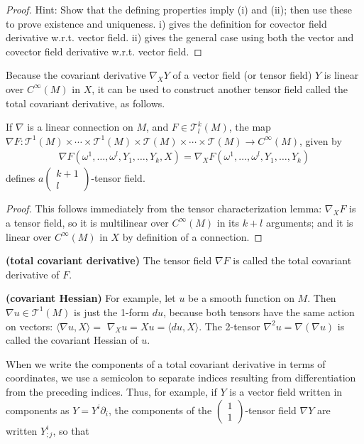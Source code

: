 \documentclass[12pt]{article} %
\newcommand{\bfs}[1]{\textbf{({#1}) }}
\begin{document}
\begin{proof}Hint: Show that the defining properties imply (i) and (ii); then use these to prove existence and uniqueness.
i) gives the definition for covector field derivative w.r.t. vector field.
ii) gives the general case using both the vector and covector field derivative w.r.t. vector field. 
\end{proof}

Because the covariant derivative $\nabla_{X} Y$ of a vector field (or tensor field) $Y$ is linear over $C^{\infty}(M)$ in $X$, it can be used to construct another tensor field called the total covariant derivative, as follows.
\begin{lema}
If $\nabla$ is a linear connection on $M$, and $F \in \mathcal{T}_{l}^{k}(M)$, the map $\nabla F: \mathcal{T}^{1}(M) \times \cdots \times \mathcal{T}^{1}(M) \times \mathcal{T}(M) \times \cdots \times \mathcal{T}(M) \rightarrow C^{\infty}(M)$, given by
\begin{align*}
\nabla F\left(\omega^{1}, \ldots, \omega^{l}, Y_{1}, \ldots, Y_{k}, X\right)=\nabla_{X} F\left(\omega^{1}, \ldots, \omega^{l}, Y_{1}, \ldots, Y_{k}\right)
\end{align*}
defines $a\left(\begin{array}{c}k+1 \\ l\end{array}\right)$-tensor field.
\end{lema} 
\begin{proof}
This follows immediately from the tensor characterization lemma: $\nabla_{X} F$ is a tensor field, so it is multilinear over $C^{\infty}(M)$ in its $k+l$ arguments; and it is linear over $C^{\infty}(M)$ in $X$ by definition of a connection.
\end{proof} 
\begin{defa}\bfs{total covariant derivative}
The tensor field $\nabla F$ is called the total covariant derivative of $F$. 
\end{defa}
\begin{exma}\bfs{covariant Hessian}
For example, let $u$ be a smooth function on $M$. Then $\nabla u \in \mathcal{T}^{1}(M)$ is just the 1-form $d u$, because both tensors have the same action on vectors: $\langle\nabla u, X\rangle=$ $\nabla_{X} u=X u=\langle d u, X\rangle$. The 2-tensor $\nabla^{2} u=\nabla(\nabla u)$ is called the covariant Hessian of $u$.
\end{exma}
When we write the components of a total covariant derivative in terms of coordinates, we use a semicolon to separate indices resulting from differentiation from the preceding indices. Thus, for example, if $Y$ is a vector field written in components as $Y=Y^{i} \partial_{i}$, the components of the $\left(\begin{array}{l}1 \\ 1\end{array}\right)$-tensor field $\nabla Y$ are written $Y_{; j}^{i}$, so that
\end{document}
